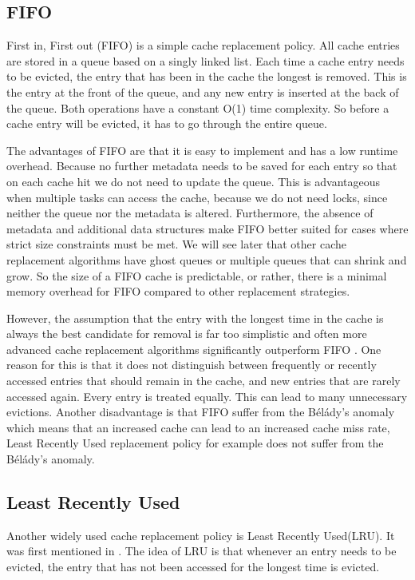 \documentclass[
	12pt,
	a4paper,
	abstract,
	bibliography=totoc,
	chapterprefix,
	headings=openright,
	numbers=endperiod,
	parskip=half,
	twoside,
]{scrreprt}
\begin{document}
\subsection{FIFO}

First in, First out (FIFO) is a simple cache replacement policy.
All cache entries are stored in a queue based on a singly linked list.
Each time a cache entry needs to be evicted, the entry that has been in the cache the longest is removed.
This is the entry at the front of the queue, and any new entry is inserted at the back of the queue. 
Both operations have a constant O(1) time complexity.
So before a cache entry will be evicted, it has to go through the entire queue.

The advantages of FIFO are that it is easy to implement and has a low runtime overhead.
Because no further metadata needs to be saved for each entry so that on each cache hit we do not need to update the queue.
This is advantageous when multiple tasks can access the cache, 
because we do not need locks, since neither the queue nor the metadata is altered.
Furthermore, the absence of metadata and additional data structures make FIFO better suited for cases where strict size constraints must be met. 
We will see later that other cache replacement algorithms have ghost queues or multiple queues that can shrink and grow. So the size 
of a FIFO cache is predictable, or rather, there is a minimal memory overhead for FIFO compared to other replacement strategies.

However, the assumption that the entry with the longest time in the cache is always the best candidate for removal is far too 
simplistic and often more advanced cache replacement algorithms significantly outperform FIFO \cite{van1992lru}.
One reason for this is that it does not distinguish between frequently or recently accessed entries that should remain in the cache, 
and new entries that are rarely accessed again. Every entry is treated equally. This can lead to many unnecessary evictions.
Another disadvantage is that FIFO suffer from the Bélády's anomaly \cite{10.1145/363011.363155} which means that an increased cache can 
lead to an increased cache miss rate, Least Recently Used replacement policy for example does not suffer from the Bélády's anomaly.

\subsection{Least Recently Used}
Another widely used cache replacement policy is Least Recently Used(LRU).
It was first mentioned in \cite{denning1980working}.
The idea of LRU is that whenever an entry needs to be evicted, the entry that has not been accessed for the longest time is evicted.
\end{document}
